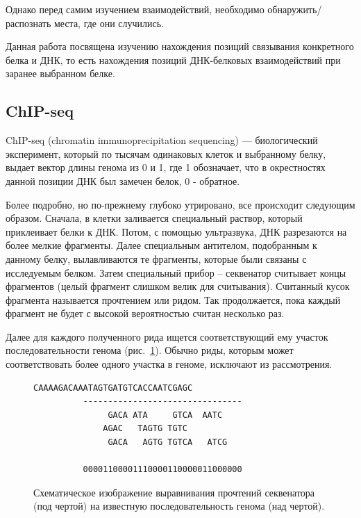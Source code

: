 \documentclass{matmex-diploma-custom}
\begin{document}
Однако перед самим изучением взаимодействий, необходимо обнаружить/распознать места, где они случились.

Данная работа посвящена изучению нахождения позиций связывания конкретного белка и ДНК, то есть нахождения позиций ДНК-белковых взаимодействий при заранее выбранном белке.

\subsection*{ChIP-seq}
ChIP-seq (chromatin immunoprecipitation sequencing) --- биологический эксперимент, который по тысячам одинаковых клеток и выбранному белку, выдает вектор длины генома из 0 и 1, где 1 обозначает, что в окрестностях данной позиции ДНК был замечен белок, 0 - обратное.

Более подробно, но по-прежнему глубоко утрировано, все происходит следующим образом. Сначала, в клетки заливается специальный раствор, который приклеивает белки к ДНК. Потом, с помощью ультразвука, ДНК разрезаются на более мелкие фрагменты. Далее специальным антителом, подобранным к данному белку, вылавливаются те фрагменты, которые были связаны с исследуемым белком. Затем специальный прибор -- секвенатор считывает концы фрагментов (целый фрагмент слишком велик для считывания). Считанный кусок фрагмента называется прочтением или ридом. 
Так продолжается, пока каждый фрагмент не будет с высокой вероятностью считан несколько раз.

Далее для каждого полученного рида ищется соответствующий
ему участок последовательности генома (рис.~\ref{fig:chip-seq}). Обычно
риды, которым может соответствовать более одного участка в геноме,
исключают из рассмотрения.

\begin{figure}[h]
  \centering

\begin{Verbatim}[commandchars=\\\{\}]
          CAAAAGACAAATAGTGATGTCACCAATCGAGC
          --------------------------------
               GACA ATA     GTCA  AATC
              AGAC   TAGTG TGTC
               GACA   AGTG TGTCA   ATCG

          00001100001110000110000011000000
\end{Verbatim}
  \caption{Схематическое изображение выравнивания прочтений секвенатора (под чертой)
    на известную последовательность генома (над чертой).}
  \label{fig:chip-seq}
\end{figure}
\end{document}
